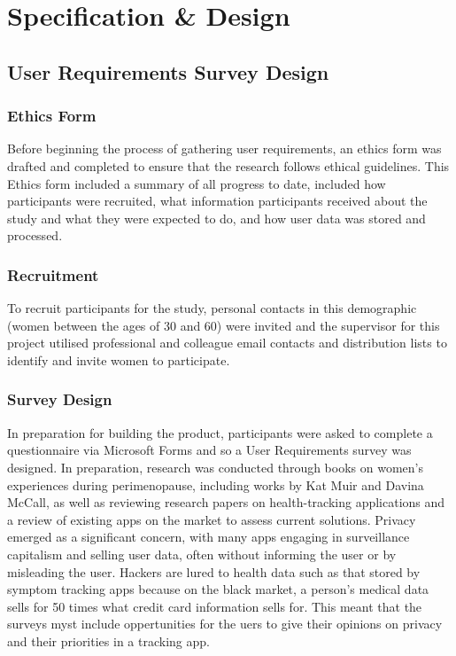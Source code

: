 
\section{Specification \& Design}\label{process}

\subsection{User Requirements Survey Design}

\subsubsection{Ethics Form}
Before beginning the process of gathering user requirements, an ethics form was drafted and completed to ensure that the research follows ethical guidelines. This Ethics form included a summary of all progress to date, included how participants were recruited, what information participants received about the study and what they were expected to do, and how user data was stored and processed. 

\subsubsection{Recruitment}
To recruit participants for the study, personal contacts in this demographic (women between the ages of 30 and 60) were invited and the supervisor for this project utilised professional and colleague email contacts and distribution lists to identify and invite women to participate. 

\subsubsection{Survey Design}
In preparation for building the product, participants were asked to complete a questionnaire via Microsoft Forms and so a User Requirements survey was designed. In preparation, research was conducted through books on women’s experiences during perimenopause, including works by Kat Muir\cite{Muir2022} and Davina McCall\cite{McCall2022}, as well as reviewing research papers on health-tracking applications and a review of existing apps on the market to assess current solutions. Privacy emerged as a significant concern, with many apps engaging in surveillance capitalism and selling user data, often without informing the user or by misleading the user\cite{Gilman_2021}\cite{FTC2021}. Hackers are lured to health data such as that stored by symptom tracking apps because on the black market, a person's medical data sells for 50 times what credit card information sells for\cite{Rosato2020}. This meant that the surveys myst include oppertunities for the uers to give their opinions on privacy and their priorities in a tracking app.


